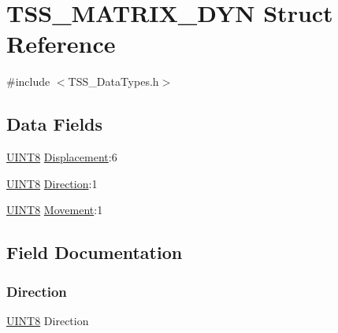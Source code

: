 \hypertarget{struct_t_s_s___m_a_t_r_i_x___d_y_n}{}\section{T\+S\+S\+\_\+\+M\+A\+T\+R\+I\+X\+\_\+\+D\+YN Struct Reference}
\label{struct_t_s_s___m_a_t_r_i_x___d_y_n}


{\ttfamily \#include $<$T\+S\+S\+\_\+\+Data\+Types.\+h$>$}

\subsection*{Data Fields}
\begin{DoxyCompactItemize}
\item 
\hyperlink{_t_s_s___data_types_8h_ab27e9918b538ce9d8ca692479b375b6a}{U\+I\+N\+T8} \hyperlink{struct_t_s_s___m_a_t_r_i_x___d_y_n_aeade839b12fc17a00b9836bf422184c6}{Displacement}\+:6
\item 
\hyperlink{_t_s_s___data_types_8h_ab27e9918b538ce9d8ca692479b375b6a}{U\+I\+N\+T8} \hyperlink{struct_t_s_s___m_a_t_r_i_x___d_y_n_acf57d62841f58ca6bd206db2fc733fc0}{Direction}\+:1
\item 
\hyperlink{_t_s_s___data_types_8h_ab27e9918b538ce9d8ca692479b375b6a}{U\+I\+N\+T8} \hyperlink{struct_t_s_s___m_a_t_r_i_x___d_y_n_aa5fac4f9f3ed46d5688c0b547f0b757e}{Movement}\+:1
\end{DoxyCompactItemize}


\subsection{Field Documentation}
\mbox{\label{struct_t_s_s___m_a_t_r_i_x___d_y_n_acf57d62841f58ca6bd206db2fc733fc0}} 
\subsubsection{\texorpdfstring{Direction}{Direction}}
{\footnotesize\ttfamily \hyperlink{_t_s_s___data_types_8h_ab27e9918b538ce9d8ca692479b375b6a}{U\+I\+N\+T8} Direction}

\mbox{\label{struct_t_s_s___m_a_t_r_i_x___d_y_n_aeade839b12fc17a00b9836bf422184c6}} 
